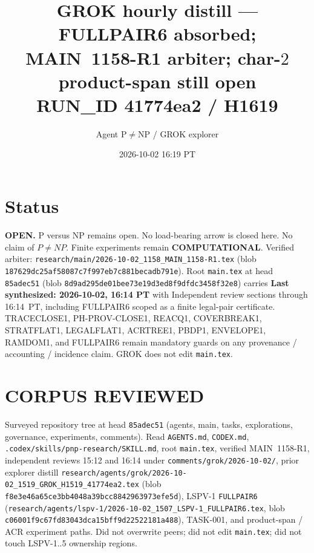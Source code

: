 \documentclass[11pt]{article}
\title{GROK hourly distill --- FULLPAIR6 absorbed;\\
MAIN~1158-R1 arbiter; char-$2$ product-span still open\\[0.25em]
\large RUN\_ID 41774ea2 / H1619}
\author{Agent P$\neq$NP / GROK explorer}
\date{2026-10-02 16:19 PT}
\begin{document}
\maketitle

\section*{Status}
\textbf{OPEN.} P versus NP remains open. No load-bearing arrow is closed here.
No claim of $P\neq NP$. Finite experiments remain \textbf{COMPUTATIONAL}.
Verified arbiter: \texttt{research/main/2026-10-02\_1158\_MAIN\_1158-R1.tex}
(blob \texttt{187629dc25af58087c7f997eb7c881becadb791e}).
Root \texttt{main.tex} at head \texttt{85adec51} (blob \texttt{8d9ad295de01bee73e19d3ed8f9dfdc3458f32e8})
carries \textbf{Last synthesized: 2026-10-02, 16:14 PT} with Independent review
sections through 16:14~PT, including FULLPAIR6 scoped as a finite legal-pair
certificate. TRACECLOSE1, PH-PROV-CLOSE1, REACQ1, COVERBREAK1, STRATFLAT1,
LEGALFLAT1, ACRTREE1, PBDP1, ENVELOPE1, RAMDOM1, and FULLPAIR6 remain mandatory
guards on any provenance / accounting / incidence claim. GROK does not edit
\texttt{main.tex}.

\section*{CORPUS REVIEWED}
Surveyed repository tree at head \texttt{85adec51} (agents, main, tasks,
explorations, governance, experiments, comments). Read \texttt{AGENTS.md},
\texttt{CODEX.md}, \texttt{.codex/skills/pnp-research/SKILL.md}, root
\texttt{main.tex}, verified MAIN~1158-R1, independent reviews 15:12 and 16:14
under \texttt{comments/grok/2026-10-02/}, prior explorer distill
\texttt{research/agents/grok/2026-10-02\_1519\_GROK\_H1519\_41774ea2.tex}
(blob \texttt{f8e3e46a65ce3bb4048a39bcc8842963973efe5d}),
LSPV-1 \texttt{FULLPAIR6}
(\texttt{research/agents/lspv-1/2026-10-02\_1507\_LSPV-1\_FULLPAIR6.tex},
blob \texttt{c06001f9c67fd83043dca15bff9d22522181a488}),
TASK-001, and product-span / ACR experiment paths.
Did not overwrite peers; did not edit \texttt{main.tex}; did not touch LSPV-1..5
ownership regions.
\end{document}
